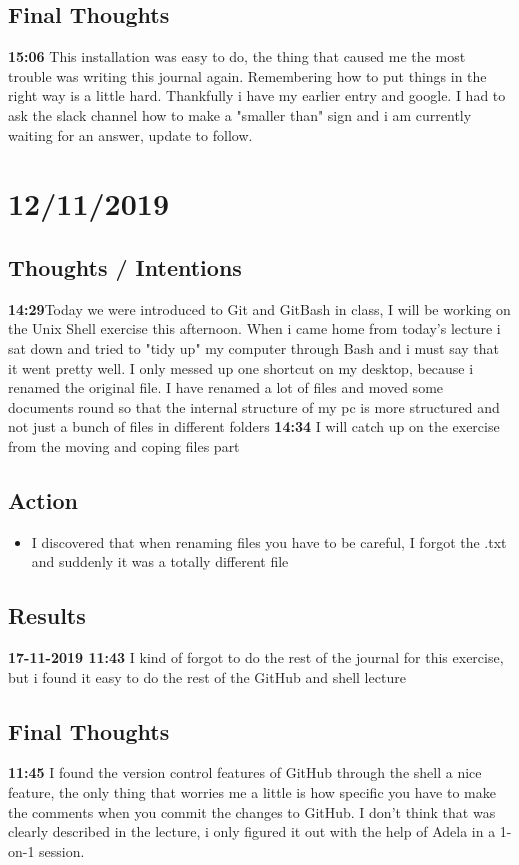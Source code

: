 \documentclass{article}
\begin{document}
\subsection{Final Thoughts}
\textbf{15:06} This installation was easy to do, the thing that caused me the most trouble was writing this journal again. Remembering how to put things in the right way is a little hard. Thankfully i have my earlier entry and google. I had to ask the slack channel how to make a "smaller than" sign and i am currently waiting for an answer, update to follow.

\section{12/11/2019}

\subsection{Thoughts / Intentions}
\textbf{14:29}Today we were introduced to Git and GitBash in class, I will be working on the Unix Shell exercise this afternoon. When i came home from today's lecture i sat down and tried to "tidy up" my computer through Bash and i must say that it went pretty well. I only messed up one shortcut on my desktop, because i renamed the original file. I have renamed a lot of files and moved some documents round so that the internal structure of my pc is more structured and not just a bunch of files in different folders 
\textbf{14:34} I will catch up on the exercise from the moving and coping files part

\subsection{Action}
\begin{itemize}
    \item I discovered that when renaming files you have to be careful, I forgot the .txt and suddenly it  was  a totally different file 
\end{itemize}{}

\subsection{Results}
\textbf{17-11-2019 11:43} I kind of forgot to do the rest of the journal for this exercise, but i found it easy to do the rest of the GitHub and shell lecture

\subsection{Final Thoughts}
\textbf{11:45} I found the version control features of GitHub through the shell a nice feature, the only thing that worries me a little is how specific you have to make the comments when you commit the changes to GitHub. I don't think that was clearly described in the lecture, i only figured it out with the help of Adela in a 1-on-1 session.
\end{document}
